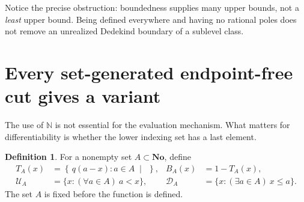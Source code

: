 \documentclass[11pt,letterpaper]{article}
\numberwithin{equation}{section}
\theoremstyle{definition}
\newtheorem{definition}[theorem]{Definition}
\theoremstyle{remark}
\newcommand{\No}{\mathbf{No}}
\newcommand{\N}{\mathbb{N}}
\newcommand{\U}{\mathcal{U}}
\newcommand{\D}{\mathcal{D}}
\newcommand{\cut}[2]{\left\{\,#1\;\middle|\;#2\,\right\}}
\begin{document}
Notice the precise obstruction: boundedness supplies many upper bounds,
not a \emph{least} upper bound. Being defined everywhere and having no
rational poles does not remove an unrealized Dedekind boundary of a
sublevel class.

\section{Every set-generated endpoint-free cut gives a variant}\label{sec:general}
The use of $\N$ is not essential for the evaluation mechanism. What
matters for differentiability is whether the lower indexing set has a
last element.

\begin{definition}
For a nonempty set $A\subset\No$, define
\begin{align}
 T_A(x)&=\cut{q(a-x):a\in A}{},& B_A(x)&=1-T_A(x),\\
 \U_A&=\{x:(\forall a\in A)\ a<x\},&
 \D_A&=\{x:(\exists a\in A)\ x\le a\}.
\end{align}
The set $A$ is fixed before the function is defined.
\end{definition}
\end{document}
